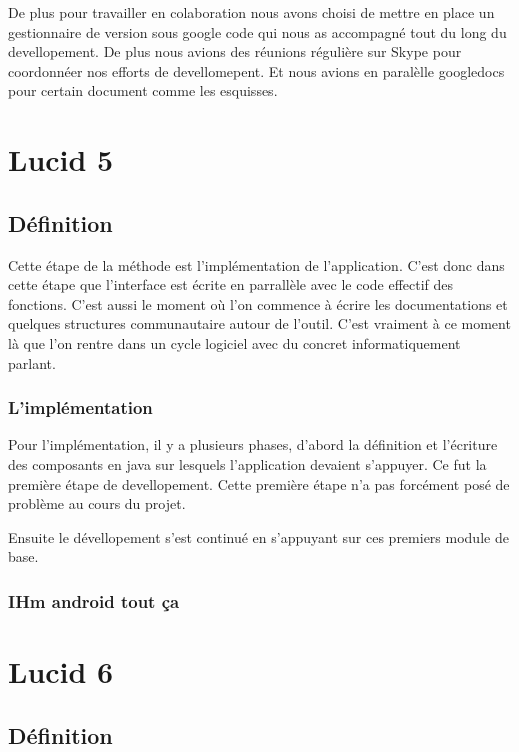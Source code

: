 \documentclass[11pt,a4paper]{article}
\begin{document}
De plus pour travailler en colaboration nous avons choisi de mettre en place un gestionnaire de version sous google code qui nous
as accompagné tout du long du devellopement. De plus nous avions des réunions régulière sur Skype pour coordonnéer nos efforts 
de devellomepent. Et nous avions en paralèlle googledocs pour certain document comme les esquisses.

\section{Lucid 5}

\subsection{Définition}

Cette étape de la méthode est l'implémentation de l'application. C'est donc dans
cette étape que l'interface est écrite en parrallèle avec le code effectif des
fonctions. C'est aussi le moment où l'on commence à écrire les documentations et
quelques structures communautaire autour de l'outil. C'est vraiment à ce moment
là que l'on rentre dans un cycle logiciel avec du concret informatiquement
parlant.

\subsubsection{L'implémentation}

Pour l'implémentation, il y a plusieurs phases, d'abord la définition et l'écriture des composants
en java sur lesquels l'application devaient s'appuyer. Ce fut la première étape de devellopement.
Cette première étape n'a pas forcément posé de problème au cours du projet.

Ensuite le dévellopement s'est continué en s'appuyant sur ces premiers module de base.


\subsubsection{IHm android tout ça}

\section{Lucid 6}

\subsection{Définition}
\end{document}
